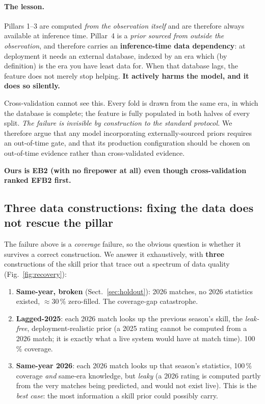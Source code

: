 \documentclass[11pt,a4paper]{article}
\begin{document}
\paragraph{The lesson.}
Pillars 1--3 are computed \emph{from the observation itself} and are therefore always available
at inference time. Pillar~4 is a \emph{prior sourced from outside the observation}, and
therefore carries an \textbf{inference-time data dependency}: at deployment it needs an external
database, indexed by an era which (by definition) is the era you have least data for. When
that database lags, the feature does not merely stop helping. \textbf{It actively harms the
model, and it does so silently.}

Cross-validation cannot see this. Every fold is drawn from the same era, in which the database is
complete; the feature is fully populated in both halves of every split. \emph{The failure is
invisible by construction to the standard protocol.} We therefore argue that any model
incorporating externally-sourced priors requires an out-of-time gate, and that its production
configuration should be chosen on out-of-time evidence rather than cross-validated evidence.

\textbf{Ours is EB2 (with no firepower at all) even though cross-validation ranked EFB2
first.}

\subsection{Three data constructions: fixing the data does not rescue the pillar}
\label{sec:lagged}

The failure above is a \emph{coverage} failure, so the obvious question is whether it survives a
correct construction. We answer it exhaustively, with \textbf{three} constructions of the skill prior
that trace out a spectrum of data quality (Fig.~\ref{fig:recovery}):

\begin{enumerate}
  \item \textbf{Same-year, broken} (Sect.~\ref{sec:holdout}): 2026 matches, no 2026 statistics existed,
    $\approx 30\,\%$ zero-filled. The coverage-gap catastrophe.
  \item \textbf{Lagged-2025}: each 2026 match looks up the previous season's skill, the
    \emph{leak-free}, deployment-realistic prior (a 2025 rating cannot be computed from a 2026 match; it
    is exactly what a live system would have at match time). 100\,\% coverage.
  \item \textbf{Same-year 2026}: each 2026 match looks up that season's statistics, 100\,\% coverage
    \emph{and} same-era knowledge, but \emph{leaky} (a 2026 rating is computed partly from the very
    matches being predicted, and would not exist live). This is the \emph{best case}: the most
    information a skill prior could possibly carry.
\end{enumerate}
\end{document}
